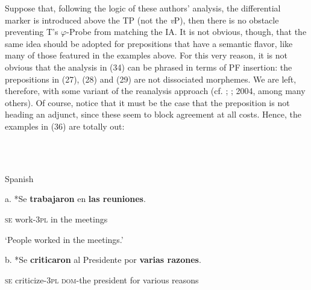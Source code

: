 \documentclass[output=paper]{langsci/langscibook}
\begin{document}
\begin{styleHTMLPreformatted}
Suppose that, following the logic of these authors’ analysis, the differential marker is introduced above the TP (not the \textit{v}P), then there is no obstacle preventing T’s $\varphi ${}-Probe from matching the IA. It is not obvious, though, that the same idea should be adopted for prepositions that have a semantic flavor, like many of those featured in the examples above. For this very reason, it is not obvious that the analysis in (34) can be phrased in terms of PF insertion: the prepositions in (27), (28) and (29) are not dissociated morphemes. We are left, therefore, with some variant of the reanalysis approach (cf. \citet{Hornstein1981}; \citealt{Kayne1975}; 2004, among many others). Of course, notice that it must be the case that the preposition is not heading an adjunct, since these seem to block agreement at all costs. Hence, the examples in (36) are totally out:
\end{styleHTMLPreformatted}

\begin{styleHTMLPreformatted}
\ea%
    \label{ex:key:36}
    \gll\\
        \\
    \glt
    \z

          Spanish
\end{styleHTMLPreformatted}

\begin{styleHTMLPreformatted}
a. *Se  \textbf{trabajaron}  en  \textbf{las reuniones}.   
\end{styleHTMLPreformatted}

\begin{styleHTMLPreformatted}
        \textsc{se}   work-\textsc{3pl}     in  the meetings
\end{styleHTMLPreformatted}

\begin{styleHTMLPreformatted}
        ‘People worked in the meetings.’
\end{styleHTMLPreformatted}

\begin{styleHTMLPreformatted}
  b. *Se   \textbf{criticaron}     al              Presidente  por \textbf{varias razones}.
\end{styleHTMLPreformatted}

\begin{styleHTMLPreformatted}
        \textsc{se}   criticize-\textsc{3pl} \textsc{dom}{}-the president      for various reasons
\end{styleHTMLPreformatted}
\end{document}
